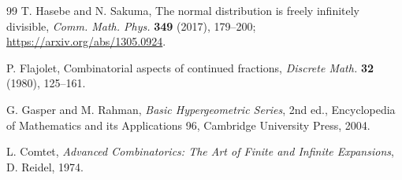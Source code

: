 \documentclass[11pt]{article}
\theoremstyle{definition}
\begin{document}
\begin{thebibliography}{99}
T. Hasebe and N. Sakuma,
The normal distribution is freely infinitely divisible,
\emph{Comm. Math. Phys.} \textbf{349} (2017), 179--200;
\url{https://arxiv.org/abs/1305.0924}.

P. Flajolet,
Combinatorial aspects of continued fractions,
\emph{Discrete Math.} \textbf{32} (1980), 125--161.

G. Gasper and M. Rahman,
\emph{Basic Hypergeometric Series}, 2nd ed.,
Encyclopedia of Mathematics and its Applications 96,
Cambridge University Press, 2004.

L. Comtet,
\emph{Advanced Combinatorics: The Art of Finite and Infinite Expansions},
D. Reidel, 1974.
\end{thebibliography}
\end{document}
